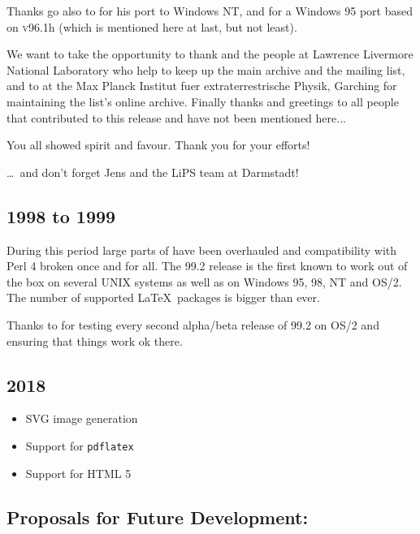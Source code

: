 \smallskip\noindent
Thanks go also to \Popineau{} for his port to Windows NT,
and \NikosDrakos{} for a Windows 95 port based on \textsc{v96.1}h
(which is mentioned here at last, but not least).

\medskip\noindent
We want to take the opportunity to thank \Nelson{} and the people at
Lawrence Livermore National Laboratory who help to keep up the
\latextohtml{} main archive and the mailing list, and to \Bohnet{} at
the Max Planck Institut fuer extraterrestrische Physik, Garching for
maintaining the list's online archive.
Finally thanks and greetings to all people that contributed to this
release and have not been mentioned here...

\medskip\noindent
You all showed spirit and favour. Thank you for your efforts!

\medskip
\begin{flushright}
\dots\ and don't forget Jens and the LiPS team at Darmstadt!
\end{flushright}

\subsection*{1998 to 1999}\label{recent99}%
During this period large parts of \latextohtml{} have been overhauled and
compatibility with Perl 4 broken once and for all. The 99.2 release is the
first known to work out of the box on several UNIX systems as well as on 
Windows 95, 98, NT and OS/2. The number of supported \LaTeX\ packages is
bigger than ever.

\medskip\noindent
Thanks to \Perbandt{} for testing every second alpha/beta release of
99.2 on OS/2 and ensuring that things work ok there.

\subsection*{2018}
\begin{itemize}
  \item SVG image generation
  \item Support for \texttt{pdflatex}
  \item Support for HTML 5
\end{itemize}


\subsection*{Proposals for Future Development:\label{future}}%

